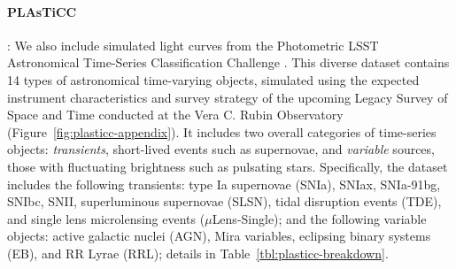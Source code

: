\paragraph{PLAsTiCC}: We also include simulated light curves from the Photometric LSST Astronomical Time-Series Classification Challenge \citep[PLAsTiCC; ][]{PLAsTiCC_2018}. This diverse dataset contains 14 types of astronomical time-varying objects, simulated using the expected instrument characteristics and survey strategy of the upcoming Legacy Survey of Space and Time \citep[LSST][]{ivezic2019lsst} conducted at the Vera C. Rubin Observatory (Figure~\ref{fig:plasticc-appendix}). It includes two overall categories of time-series objects: \textit{transients}, short-lived events such as supernovae, and \textit{variable} sources, those with fluctuating brightness such as pulsating stars. Specifically, the dataset includes the following transients: type Ia supernovae (SNIa), SNIax, SNIa-91bg, SNIbc, SNII, superluminous supernovae (SLSN), tidal disruption events (TDE), and single lens microlensing events ($\mu$Lens-Single); and the following variable objects: active galactic nuclei (AGN), Mira variables, eclipsing binary systems (EB), and RR Lyrae (RRL); details in Table~\ref{tbl:plasticc-breakdown}.  

\begin{table}[]
    \centering
    \caption{Breakdown of the PLAsTiCC train and test datasets by object type. The small training set size coupled with the class imbalances make this a challenging classification dataset.}
    \label{tbl:plasticc-breakdown}
\end{table}

